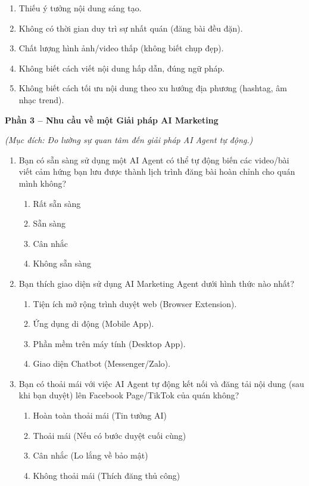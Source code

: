 \begin{enumerate}
  \begin{enumerate}
  \def\labelenumii{\arabic{enumii}.}
  \item
    Thiếu ý tưởng nội dung sáng tạo.
  \item
    Không có thời gian duy trì sự nhất quán (đăng bài đều đặn).
  \item
    Chất lượng hình ảnh/video thấp (không biết chụp đẹp).
  \item
    Không biết cách viết nội dung hấp dẫn, đúng ngữ pháp.
  \item
    Không biết cách tối ưu nội dung theo xu hướng địa phương (hashtag,
    âm nhạc trend).
  \end{enumerate}
\end{enumerate}

\textbf{Phần 3 -- Nhu cầu về một Giải pháp AI Marketing}

\emph{(Mục đích: Đo lường sự quan tâm đến giải pháp AI Agent tự động.)}

\begin{enumerate}
\def\labelenumi{\arabic{enumi}.}
\setcounter{enumi}{8}
\item
  Bạn có sẵn sàng sử dụng một AI Agent có thể tự động biến các video/bài
  viết cảm hứng bạn lưu được thành lịch trình đăng bài hoàn chỉnh cho
  quán mình không?

  \begin{enumerate}
  \def\labelenumii{\arabic{enumii}.}
  \item
    Rất sẵn sàng
  \item
    Sẵn sàng
  \item
    Cân nhắc
  \item
    Không sẵn sàng
  \end{enumerate}
\item
  Bạn thích giao diện sử dụng AI Marketing Agent dưới hình thức nào
  nhất?

  \begin{enumerate}
  \def\labelenumii{\arabic{enumii}.}
  \item
    Tiện ích mở rộng trình duyệt web (Browser Extension).
  \item
    Ứng dụng di động (Mobile App).
  \item
    Phần mềm trên máy tính (Desktop App).
  \item
    Giao diện Chatbot (Messenger/Zalo).
  \end{enumerate}
\item
  Bạn có thoải mái với việc AI Agent tự động kết nối và đăng tải nội
  dung (sau khi bạn duyệt) lên Facebook Page/TikTok của quán không?

  \begin{enumerate}
  \def\labelenumii{\arabic{enumii}.}
  \item
    Hoàn toàn thoải mái (Tin tưởng AI)
  \item
    Thoải mái (Nếu có bước duyệt cuối cùng)
  \item
    Cân nhắc (Lo lắng về bảo mật)
  \item
    Không thoải mái (Thích đăng thủ công)
  \end{enumerate}
\end{enumerate}

